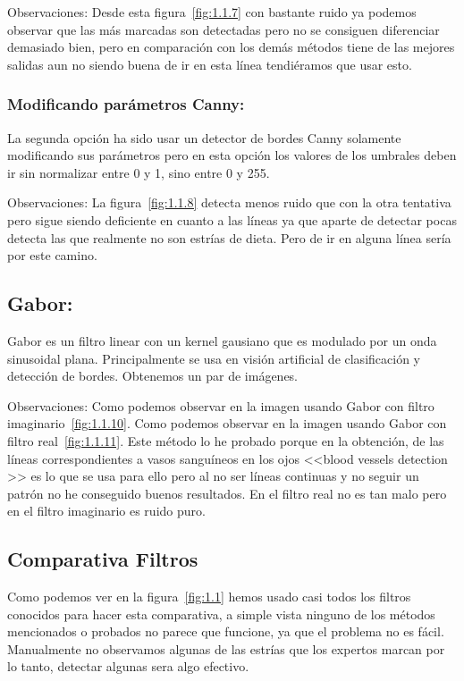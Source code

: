 Observaciones:
Desde esta figura~\ref{fig:1.1.7} con bastante ruido ya podemos observar que las más marcadas son detectadas pero no se consiguen diferenciar demasiado bien, pero en comparación con los demás métodos tiene de las mejores salidas aun no siendo buena de ir en esta línea tendiéramos que usar esto.

\subsubsection{Modificando parámetros Canny:}

La segunda opción ha sido usar un detector de bordes Canny solamente modificando sus parámetros pero en esta opción los valores de los umbrales deben ir sin normalizar entre 0 y 1, sino entre 0 y 255.


Observaciones:
La figura~\ref{fig:1.1.8} detecta menos ruido que con la otra tentativa pero sigue siendo deficiente en cuanto a las líneas ya que aparte de detectar pocas detecta las que realmente no son estrías de dieta. Pero de ir en alguna línea sería por este camino.



\subsection{Gabor:}

Gabor \cite{wiki:Gabor} es un filtro linear con un kernel gausiano  que es modulado por un onda sinusoidal plana. Principalmente se usa en visión artificial de clasificación y detección de bordes.
Obtenemos un par de imágenes.



Observaciones:
Como podemos observar en la imagen usando Gabor con filtro imaginario~\ref{fig:1.1.10}.
Como podemos observar en la imagen usando Gabor con filtro real~\ref{fig:1.1.11}.
Este método lo he probado porque en la obtención, de las líneas correspondientes a vasos sanguíneos en los ojos <<blood vessels detection \cite{Xu2010}>> es lo que se usa para ello pero al no ser líneas continuas y no seguir un patrón no he conseguido buenos resultados. En el filtro real no es tan malo pero en el filtro imaginario es ruido puro.
\subsection{Comparativa Filtros}
Como podemos ver en la figura~\ref{fig:1.1} hemos usado casi todos los filtros conocidos para hacer esta comparativa, a simple vista ninguno de los métodos mencionados o probados no parece que funcione, ya que el problema no es fácil.
Manualmente no observamos algunas de las estrías que los expertos marcan por lo tanto, detectar algunas sera algo efectivo.

